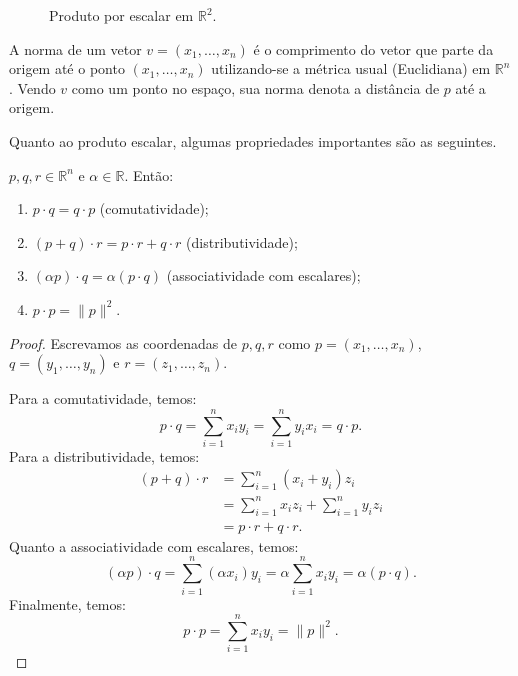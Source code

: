 \begin{figure}[ht]
    \centering
    \caption{Produto por escalar em $\mathbb R^2$.}
\end{figure}

A norma de um vetor $v=(x_1, \ldots, x_n)$ é o comprimento do vetor que parte da origem até o ponto $(x_1, \ldots, x_n)$ utilizando-se a métrica  usual (Euclidiana) em $\mathbb R^n$.
Vendo $v$ como um ponto no espaço, sua norma denota a distância de $p$ até a origem.

Quanto ao produto escalar, algumas propriedades importantes são as seguintes.

\begin{proposition}
    $p, q, r \in \mathbb R^n$ e $\alpha \in \mathbb R$. Então:
    \begin{enumerate}
        \item $p \cdot q = q \cdot p$ (comutatividade);
        \item $(p+q) \cdot r = p \cdot r + q \cdot r$ (distributividade);
        \item $(\alpha p) \cdot q = \alpha(p \cdot q)$ (associatividade com escalares);
        \item $p \cdot p = \|p\|^2$.
    \end{enumerate}
\end{proposition}

\begin{proof}
    Escrevamos as coordenadas de $p, q, r$ como $p=(x_1, \ldots, x_n)$, $q=(y_1, \ldots, y_n)$ e $r=(z_1, \ldots, z_n)$.

    Para a comutatividade, temos:
    \begin{equation*}
        p \cdot q = \sum_{i=1}^n x_iy_i = \sum_{i=1}^n y_ix_i = q \cdot p.
    \end{equation*}
    Para a distributividade, temos:
    \begin{align*}
        (p+q) \cdot r &= \sum_{i=1}^n (x_i+y_i)z_i \\
        &= \sum_{i=1}^n x_iz_i + \sum_{i=1}^n y_iz_i \\
        &= p \cdot r + q \cdot r.
    \end{align*}
    Quanto a associatividade com escalares, temos:
    \begin{equation*}
        (\alpha p) \cdot q = \sum_{i=1}^n (\alpha x_i)y_i = \alpha \sum_{i=1}^n x_iy_i = \alpha (p \cdot q).
    \end{equation*}
    Finalmente, temos:
    \begin{equation*}
        p \cdot p = \sum_{i=1}^n x_iy_i = \|p\|^2.
    \end{equation*}
\end{proof}

